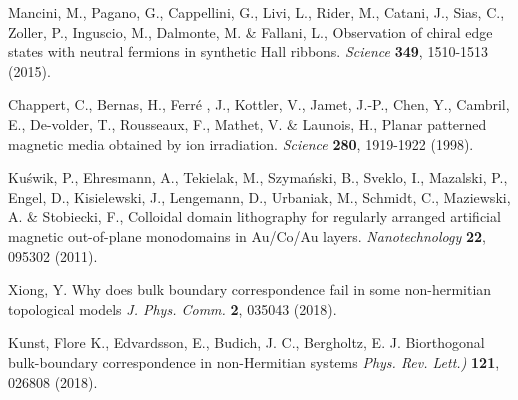 \documentclass[12pt]{iopart}
\newcommand{\rem}[1]{}
\begin{document}
\begin{thebibliography}{10}
		Mancini, M., Pagano, G., Cappellini, G., Livi, L., Rider, M., Catani, J., Sias, C.,
		Zoller, P., Inguscio, M., Dalmonte, M. \& Fallani, L.,
		Observation of chiral edge states with neutral fermions in synthetic Hall ribbons.
		{\it Science} {\bf 349}, 1510-1513 (2015).
      

		Chappert, C., Bernas, H., Ferr\'e , J., Kottler, V., Jamet, J.-P., Chen, Y.,
 		Cambril, E.,   De-volder, T.,  Rousseaux, F., Mathet, V. \& Launois, H., 
		Planar patterned magnetic media obtained by ion irradiation. 
		{\it Science} {\bf 280}, 1919-1922 (1998).

 	 Ku\'{s}wik, P., Ehresmann, A., Tekielak, M., Szyma\'{n}ski, B., Sveklo, I.,   	
		Mazalski, P., Engel, D.,  Kisielewski, J., Lengemann, D., Urbaniak, M., Schmidt, C.,  
		Maziewski, A. \& Stobiecki, F.,
		Colloidal domain lithography for regularly arranged artificial magnetic out-of-plane monodomains in Au/Co/Au layers.
        {\it Nanotechnology} {\bf 22}, 095302 (2011).

		Xiong,  Y.
		Why does bulk boundary correspondence fail in some non-hermitian topological models
		{\it J. Phys. Comm.} {\bfseries 2}, 035043 (2018).

		Kunst, Flore K., Edvardsson, E., Budich, J. C., Bergholtz, E. J.
		Biorthogonal bulk-boundary correspondence in non-Hermitian systems
		{\it Phys. Rev. Lett.)} {\bfseries 121}, 026808 (2018).

\rem{
\bibitem{Bernevig}
		Bernevig,  B. A. \& Zhang, S.-C., 
		Quantum Spin Hall Effect.
		{\it Phys. Rev. Lett.} {\bfseries 96}, 106802 (2006).
		



\bibitem{Lubinsky}{
	Senyuk, B., Liu, Q., He, S., Kamien, R. D., Kusner, R. B., Lubensky T. C. \& Smalyukh, I. I. 
	Topological colloids.
	{\it Nature} {\bfseries 493}, 200-205 (2013).  	 }

\bibitem{Martinez}{Martinez, A., Hermosillo, L., Tasinkevych, M. \& Smalyukh, I. I. 
	Linked topological colloids in a nematic host
	{\it Proc. Nat. Acad. Sci.}  {\bfseries 112}, 4546-4551 (2015).
  }

\bibitem{bubble}{
Tierno, P., Johansen, T. H., \& Fischer Th. M.
Localized and Delocalized Motion of Colloidal Particles on a Magnetic Bubble Lattice
{\it Phys. Rev. Lett.} {\bfseries 99}, 038303  (2007).}

\bibitem{excluded}{
	Tierno, P.  \& Fischer Th. M.
	Excluded Volume Causes Integer and Fractional Plateaus in Colloidal Ratchet Currents
	{\it Phys. Rev. Lett.} {\bfseries 112}, 048302  (2014).}

\bibitem{Glotzer}
	Glotzer, S. C.\& Solomon, M. J.,
	Anisotropy of building blocks and their assembly into complex structures.
	{\it Nat. Mat.} {\bfseries 6}, 557-562 (2007).

\bibitem{poon}
    Poon, W.,
    Colloids as Big Atoms.
    {\it Science} {\bfseries 304}, 830-831 (2004).

}

	\end{thebibliography}
\end{document}
